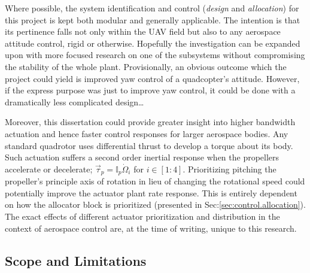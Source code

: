 \par
Where possible, the system identification and control (\emph{design} and \emph{allocation}) for this project is kept both modular and generally applicable. The intention is that its pertinence falls not only within the UAV field but also to any aerospace attitude control, rigid or otherwise. Hopefully the investigation can be expanded upon with more focused research on one of the subsystems without compromising the stability of the whole plant. Provisionally, an obvious outcome which the project could yield is improved yaw control of a quadcopter's attitude. However, if the express purpose was just to improve yaw control, it could be done with a dramatically less complicated design\ldots
\par
Moreover, this dissertation could provide greater insight into higher bandwidth actuation and hence faster control responses for larger aerospace bodies. Any standard quadrotor uses differential thrust to develop a torque about its body. Such actuation suffers a second order inertial response when the propellers accelerate or decelerate; $\vec{\tau}_{p}=\mathbb{I}_p\dot{\Omega}_i$ for $i\in[1:4]$. Prioritizing pitching the propeller's principle axis of rotation in lieu of changing the rotational speed could potentially improve the actuator plant rate response. This is entirely dependent on how the allocator block is prioritized (presented in Sec:\ref{sec:control.allocation}). The exact effects of different actuator prioritization and distribution in the context of aerospace control are, at the time of writing, unique to this research.
\subsection{Scope and Limitations}
\label{subsec:intro.foreword.scopeandlim}
